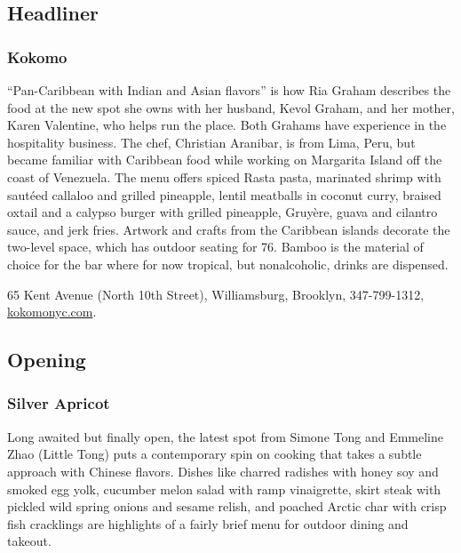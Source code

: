 \hypertarget{headliner}{%
\subsection{Headliner}\label{headliner}}

\hypertarget{kokomo}{%
\subsubsection{Kokomo}\label{kokomo}}

``Pan-Caribbean with Indian and Asian flavors'' is how Ria Graham
describes the food at the new spot she owns with her husband, Kevol
Graham, and her mother, Karen Valentine, who helps run the place. Both
Grahams have experience in the hospitality business. The chef, Christian
Aranibar, is from Lima, Peru, but became familiar with Caribbean food
while working on Margarita Island off the coast of Venezuela. The menu
offers spiced Rasta pasta, marinated shrimp with sautéed callaloo and
grilled pineapple, lentil meatballs in coconut curry, braised oxtail and
a calypso burger with grilled pineapple, Gruyère, guava and cilantro
sauce, and jerk fries. Artwork and crafts from the Caribbean islands
decorate the two-level space, which has outdoor seating for 76. Bamboo
is the material of choice for the bar where for now tropical, but
nonalcoholic, drinks are dispensed.

65 Kent Avenue (North 10th Street), Williamsburg, Brooklyn,
347-799-1312, \href{https://www.kokomonyc.com/}{kokomonyc.com}.

\hypertarget{opening}{%
\subsection{Opening}\label{opening}}

\hypertarget{silver-apricot-}{%
\subsubsection{Silver Apricot }\label{silver-apricot-}}

Long awaited but finally open, the latest spot from Simone Tong and
Emmeline Zhao (Little Tong) puts a contemporary spin on cooking that
takes a subtle approach with Chinese flavors. Dishes like charred
radishes with honey soy and smoked egg yolk, cucumber melon salad with
ramp vinaigrette, skirt steak with pickled wild spring onions and sesame
relish, and poached Arctic char with crisp fish cracklings are
highlights of a fairly brief menu for outdoor dining and takeout.


